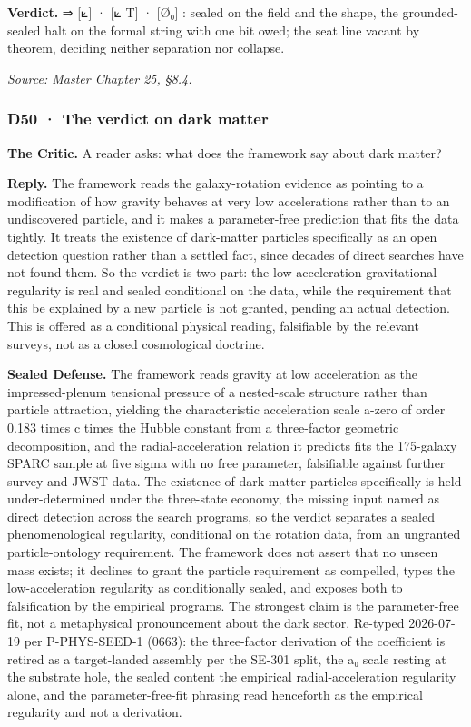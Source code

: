 \documentclass[10pt,twocolumn]{article}
\begin{document}
\textbf{Verdict.} ⇒ {[}⟀{]} · {[}⟀ T{]} · {[}Ø₀{]} : sealed on the field
and the shape, the grounded-sealed halt on the formal string with one
bit owed; the seat line vacant by theorem, deciding neither separation
nor collapse.

\emph{Source: Master Chapter 25, §8.4.}

\hypertarget{d50-the-verdict-on-dark-matter}{%
\subsubsection{D50 · The verdict on dark
matter}\label{d50-the-verdict-on-dark-matter}}

\textbf{The Critic.} A reader asks: what does the framework say about
dark matter?

\textbf{Reply.} The framework reads the galaxy-rotation evidence as
pointing to a modification of how gravity behaves at very low
accelerations rather than to an undiscovered particle, and it makes a
parameter-free prediction that fits the data tightly. It treats the
existence of dark-matter particles specifically as an open detection
question rather than a settled fact, since decades of direct searches
have not found them. So the verdict is two-part: the low-acceleration
gravitational regularity is real and sealed conditional on the data,
while the requirement that this be explained by a new particle is not
granted, pending an actual detection. This is offered as a conditional
physical reading, falsifiable by the relevant surveys, not as a closed
cosmological doctrine.

\textbf{Sealed Defense.} The framework reads gravity at low acceleration
as the impressed-plenum tensional pressure of a nested-scale structure
rather than particle attraction, yielding the characteristic
acceleration scale a-zero of order 0.183 times c times the Hubble
constant from a three-factor geometric decomposition, and the
radial-acceleration relation it predicts fits the 175-galaxy SPARC
sample at five sigma with no free parameter, falsifiable against further
survey and JWST data. The existence of dark-matter particles
specifically is held under-determined under the three-state economy, the
missing input named as direct detection across the search programs, so
the verdict separates a sealed phenomenological regularity, conditional
on the rotation data, from an ungranted particle-ontology requirement.
The framework does not assert that no unseen mass exists; it declines to
grant the particle requirement as compelled, types the low-acceleration
regularity as conditionally sealed, and exposes both to falsification by
the empirical programs. The strongest claim is the parameter-free fit,
not a metaphysical pronouncement about the dark sector. Re-typed
2026-07-19 per P-PHYS-SEED-1 (0663): the three-factor derivation of the
coefficient is retired as a target-landed assembly per the SE-301 split,
the a₀ scale resting at the substrate hole, the sealed content the
empirical radial-acceleration regularity alone, and the
parameter-free-fit phrasing read henceforth as the empirical regularity
and not a derivation.
\end{document}
